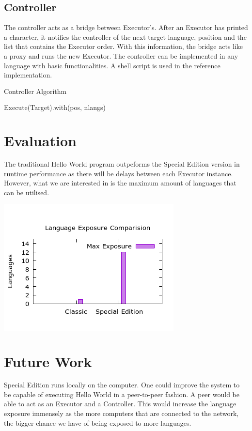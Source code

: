 \documentclass[11pt]{article}
\begin{document}
\subsection{Controller}
The controller acts as a bridge between Executor's. After an Executor has printed a character, it notifies the controller of the next target language, position and the list that contains the Executor order. With this information, the bridge acts like a proxy and runs the new Executor. The controller can be implemented in any language with basic functionalities. A shell script is used in the reference implementation.
\vfill
\raggedbottom

\begin{algorithm}[H]
\caption{Controller Algorithm}
\label{Special Edition}
\begin{algorithmic}[2]
	\State Execute(Target).with(pos, nlangs)
\EndProcedure
\end{algorithmic}
\end{algorithm}

\section{Evaluation}
The traditional Hello World program outpeforms the Special Edition version in runtime performance as there will be delays between each Executor instance. However, what we are interested in is the maximum amount of languages that can be utilised.

\includegraphics[scale=0.65]{img/exposure.png}


\section{Future Work}
Special Edition runs locally on the computer. One could improve the system to be capable of executing Hello World in a peer-to-peer fashion. A peer would be able to act as an Executor and a Controller. This would increase the language exposure immensely as the more computers that are connected to the network, the bigger chance we have of being exposed to more languages.
\end{document}
